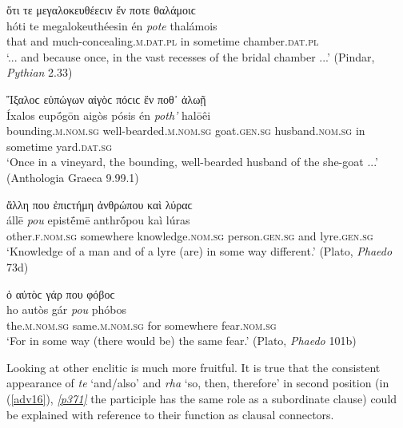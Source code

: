\begin{exe}
\ex ὅτι τε μεγαλοκευθέεϲιν ἔν ποτε θαλάμοιϲ\\
\gll hóti te megalokeuthéesin én \emph{pote} thalámois\\
that and much-concealing.\textsc{m.dat.pl} in sometime chamber.\textsc{dat.pl}\\
\trans `... and because once, in the vast recesses of the bridal
chamber ...' (Pindar, \textit{Pythian} 2.33)
\label{adv12}
\end{exe}

\begin{exe}
\ex Ἴξαλοϲ εὐπώγων αἰγὸϲ πόϲιϲ ἔν ποθ᾽ ἁλωῇ\\
\gll Íxalos eupṓgōn aigòs pósis én \emph{poth'} halōêi\\
bounding.\textsc{m.nom.sg} well-bearded.\textsc{m.nom.sg} goat.\textsc{gen.sg} husband.\textsc{nom.sg} in sometime yard.\textsc{dat.sg}\\
\trans `Once in a vineyard, the bounding, well-bearded husband of the she-goat ...' (Anthologia Graeca 9.99.1)
\label{adv13}
\end{exe}

\begin{exe}
\ex ἄλλη που ἐπιϲτήμη ἀνθρώπου καὶ λύραϲ\\
\gll állē \emph{pou} epistḗmē anthrṓpou kaì lúras\\
other.\textsc{f.nom.sg} somewhere knowledge.\textsc{nom.sg}
person.\textsc{gen.sg} and lyre.\textsc{gen.sg}\\
\trans `Knowledge of a man and of a lyre (are) in some way different.' (Plato, \textit{Phaedo} 73d)
\label{adv14}
\end{exe}

\begin{exe}
\ex ὁ αὐτὸϲ γάρ που φόβοϲ\\
\gll ho autòs gár \emph{pou} phóbos\\
the.\textsc{m.nom.sg} same.\textsc{m.nom.sg} for somewhere
fear.\textsc{nom.sg}\\
\trans `For in some way (there would be) the same fear.' (Plato, \textit{Phaedo} 101b)
\label{adv15}
\end{exe}

Looking at other enclitic  is much more fruitful. It is true that the consistent appearance of \textit{te} `and/also' and \textit{rha} `so, then, therefore' in second position (in (\ref{adv16}), \hyperlink{p371}{\emph{[p371]}} the participle has the same role as a subordinate clause) could be explained with reference to their function as clausal connectors. 

